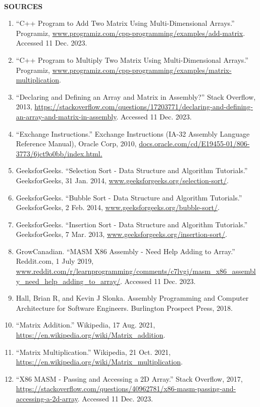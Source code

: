 \documentclass[twoside]{article}
\begin{document}
\newpage
\noindent \\ \textbf{SOURCES}
\begin{enumerate}
\item “C++ Program to Add Two Matrix Using Multi-Dimensional Arrays.” Programiz, \url{www.programiz.com/cpp-programming/examples/add-matrix}. Accessed 11 Dec. 2023.
\item “C++ Program to Multiply Two Matrix Using Multi-Dimensional Arrays.” Programiz, \url{www.programiz.com/cpp-programming/examples/matrix-multiplication}.
\item “Declaring and Defining an Array and Matrix in Assembly?” Stack Overflow, 2013, \url{https://stackoverflow.com/questions/17203771/declaring-and-defining-an-array-and-matrix-in-assembly}. Accessed 11 Dec. 2023.
\item “Exchange Instructions.” Exchange Instructions (IA-32 Assembly Language Reference Manual), Oracle Corp, 2010, \url{docs.oracle.com/cd/E19455-01/806-3773/6jct9o0bb/index.html.}
\item GeeksforGeeks. “Selection Sort - Data Structure and Algorithm Tutorials.” GeeksforGeeks, 31 Jan. 2014, \url{www.geeksforgeeks.org/selection-sort/}.
\item GeeksforGeeks. “Bubble Sort - Data Structure and Algorithm Tutorials.” GeeksforGeeks, 2 Feb. 2014, \url{www.geeksforgeeks.org/bubble-sort/}.
\item GeeksforGeeks. “Insertion Sort - Data Structure and Algorithm Tutorials.” GeeksforGeeks, 7 Mar. 2013, \url{www.geeksforgeeks.org/insertion-sort/}.
\item GrowCanadian. “MASM X86 Assembly - Need Help Adding to Array.” Reddit.com, 1 July 2019, \url{www.reddit.com/r/learnprogramming/comments/c7lvgj/masm_x86_assembly_need_help_adding_to_array/}. Accessed 11 Dec. 2023.
\item Hall, Brian R, and Kevin J Slonka. Assembly Programming and Computer Architecture for Software Engineers. Burlington Prospect Press, 2018.
\item “Matrix Addition.” Wikipedia, 17 Aug. 2021, \url{https://en.wikipedia.org/wiki/Matrix_addition}.
\item “Matrix Multiplication.” Wikipedia, 21 Oct. 2021, \url{https://en.wikipedia.org/wiki/Matrix_multiplication}.
\item “X86 MASM - Passing and Accessing a 2D Array.” Stack Overflow, 2017, \url{https://stackoverflow.com/questions/40962781/x86-masm-passing-and-accessing-a-2d-array}. Accessed 11 Dec. 2023.
\end{enumerate}
\end{document}
